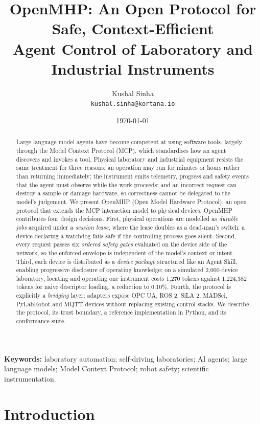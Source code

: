 \documentclass[11pt]{article}
\title{\textbf{OpenMHP: An Open Protocol for Safe, Context-Efficient\\
Agent Control of Laboratory and Industrial Instruments}}
\author{
  Kushal Sinha\\
  \texttt{kushal.sinha@kortana.io}\\
  \TODO{affiliation, ORCID, any co-authors}
}
\date{\today}
\begin{document}
\maketitle

\begin{abstract}
Large language model agents have become competent at using software tools, largely through
the Model Context Protocol (MCP), which standardises how an agent discovers and invokes a
tool. Physical laboratory and industrial equipment resists the same treatment for three
reasons: an operation may run for minutes or hours rather than returning immediately; the
instrument emits telemetry, progress and safety events that the agent must observe while the
work proceeds; and an incorrect request can destroy a sample or damage hardware, so
correctness cannot be delegated to the model's judgement. We present OpenMHP (Open Model
Hardware Protocol), an open protocol that extends the MCP interaction model to physical
devices. OpenMHP contributes four design decisions. First, physical operations are modelled
as \emph{durable jobs} acquired under a \emph{session lease}, where the lease doubles as a
dead-man's switch: a device declaring a watchdog fails safe if the controlling process goes
silent. Second, every request passes six \emph{ordered safety gates} evaluated on the device
side of the network, so the enforced envelope is independent of the model's context or
intent. Third, each device is distributed as a \emph{device package} structured like an Agent
Skill, enabling progressive disclosure of operating knowledge; on a simulated 2{,}000-device
laboratory, locating and operating one instrument costs 1{,}270 tokens against 1{,}224{,}382
tokens for naive descriptor loading, a reduction to 0.10\%. Fourth, the protocol is
explicitly a \emph{bridging} layer: adapters expose OPC UA, ROS 2, SiLA 2, MADSci, PyLabRobot
and MQTT devices without replacing existing control stacks. We describe the protocol, its
trust boundary, a reference implementation in Python, and its conformance suite.
\end{abstract}

\noindent\textbf{Keywords:} laboratory automation; self-driving laboratories; AI agents;
large language models; Model Context Protocol; robot safety; scientific instrumentation.

\section{Introduction}
\label{sec:intro}
\end{document}
